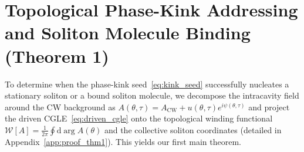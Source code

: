\documentclass[11pt,letterpaper]{article}
\begin{document}
\section{Topological Phase-Kink Addressing and Soliton Molecule Binding (Theorem 1)}
\label{sec:theorem1}

To determine when the phase-kink seed~\eqref{eq:kink_seed} successfully nucleates a stationary soliton or a bound soliton molecule, we decompose the intracavity field around the CW background as $A(\theta, \tau) = A_{\mathrm{CW}} + u(\theta, \tau)e^{i\psi(\theta, \tau)}$ and project the driven CGLE~\eqref{eq:driven_cgle} onto the topological winding functional $\mathcal{W}[A] = \frac{1}{2\pi}\oint \mathrm{d}\arg A(\theta)$ and the collective soliton coordinates (detailed in Appendix~\ref{app:proof_thm1}). This yields our first main theorem.
\end{document}
